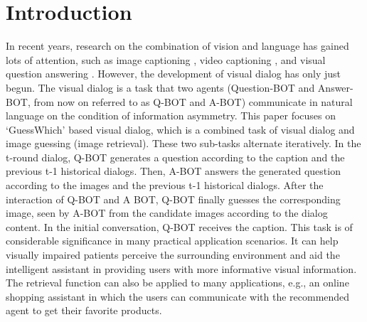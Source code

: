\documentclass[review]{elsarticle}
\begin{document}
	\section{Introduction}
	In recent years, research on the combination of vision and language has gained lots of attention, such as image captioning \cite{gao2019hierarchical, DBLP:conf/cvpr/VinyalsTBE15}, video captioning \cite{song2018deterministic, venugopalan2015sequence}, and visual question answering \cite{DBLP:journals/pami/DonahueHRVGSD17, DBLP:conf/iccv/AntolALMBZP15, DBLP:journals/cviu/WuTWSDH17, li2019beyond}. 
	However, the development of visual dialog has only just begun. The visual dialog is a task that two agents (Question-BOT and Answer-BOT, from now on referred to as Q-BOT and A-BOT) communicate in natural language on the condition of information asymmetry. This paper focuses on `GuessWhich' based visual dialog, which is a combined task of visual dialog and image guessing (image retrieval). These two sub-tasks alternate iteratively.
	In the t-round dialog, Q-BOT generates a question according to the caption and the previous t-1 historical dialogs. Then, A-BOT answers the generated question according to the images and the previous t-1 historical dialogs. After the interaction of Q-BOT and A BOT, Q-BOT finally guesses the corresponding image, seen by A-BOT from the candidate images according to the dialog content. In the initial conversation, Q-BOT receives the caption.
	This task is of considerable significance in many practical application scenarios. 
	It can help visually impaired patients perceive the surrounding environment and aid the intelligent assistant in providing users with more informative visual information. The retrieval function can also be applied to many applications, e.g., an online shopping assistant in which the users can communicate with the recommended agent to get their favorite products. 
	
\end{document}
